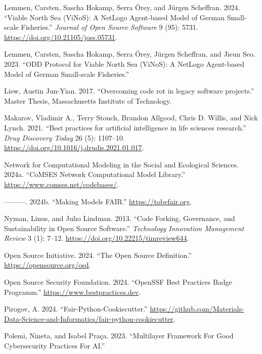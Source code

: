 \documentclass[preprint,11pt,5p]{elsarticle}
\newlength{\cslhangindent}
\newenvironment{CSLReferences}[2] %
{\begin{list}{}{%
	\setlength{\itemindent}{0pt}
	\setlength{\leftmargin}{0pt}
	\setlength{\parsep}{0pt}
	\ifodd #1
	\setlength{\leftmargin}{\cslhangindent}
	\setlength{\itemindent}{-1\cslhangindent}
	\fi
	\setlength{\itemsep}{#2\baselineskip}}}
{\end{list}}
\begin{document}
\begin{CSLReferences}{1}{0}
Lemmen, Carsten, Sascha Hokamp, Serra Örey, and Jürgen Scheffran. 2024.
{``{Viable North Sea (ViNoS): A NetLogo Agent-based Model of German
Small-scale Fisheries}.''} \emph{Journal of Open Source Software} 9
(95): 5731. \url{https://doi.org/10.21105/joss.05731}.

Lemmen, Carsten, Sascha Hokamp, Serra Örey, Jürgen Scheffran, and Jieun
Seo. 2023. {``{ODD Protocol for Viable North Sea (ViNoS): A NetLogo
Agent-based Model of German Small-scale Fisheries}.''}

Liew, Austin Jun-Yian. 2017. {``{Overcoming code rot in legacy software
projects}.''} Master Thesis, Massachusetts Institute of Technology.

Makarov, Vladimir A., Terry Stouch, Brandon Allgood, Chris D. Willis,
and Nick Lynch. 2021. {``{Best practices for artificial intelligence in
life sciences research}.''} \emph{Drug Discovery Today} 26 (5):
1107--10. \url{https://doi.org/10.1016/j.drudis.2021.01.017}.

Network for Computational Modeling in the Social and Ecological
Sciences. 2024a. {``{CoMSES Network Computational Model Library}.''}
\url{https://www.comses.net/codebases/}.

---------. 2024b. {``{Making Models FAIR}.''}
\url{https://tobefair.org}.

Nyman, Linus, and Juho Lindman. 2013. {``{Code Forking, Governance, and
Sustainability in Open Source Software}.''} \emph{Technology Innovation
Management Review} 3 (1): 7--12.
\url{https://doi.org/10.22215/timreview644}.

Open Source Initiative. 2024. {``{The Open Source Definition}.''}
\url{https://opensource.org/osd}.

Open Source Security Foundation. 2024. {``{OpenSSF Best Practices Badge
Programm}.''} \url{https://www.bestpractices.dev}.

Pirogov, A. 2024. {``Fair-Python-Cookiecutter.''}
\url{https://github.com/Materials-Data-Science-and-Informatics/fair-python-cookiecutter}.

Polemi, Nineta, and Isabel Praça. 2023. {``{Multilayer Framework For
Good Cybersecurity Practices For AI}.''}


\end{CSLReferences}
\end{document}
